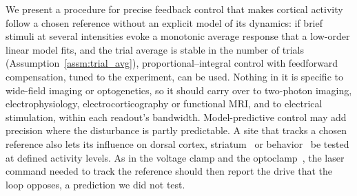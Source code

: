 We present a procedure for precise feedback control that makes cortical activity follow a chosen reference without an explicit model of its dynamics: if brief stimuli at several intensities evoke a monotonic average response that a low-order linear model fits, and the trial average is stable in the number of trials (Assumption~\ref{assm:trial_avg}), proportional--integral control with feedforward compensation, tuned to the experiment, can be used.
Nothing in it is specific to wide-field imaging or optogenetics, so it should carry over to two-photon imaging, electrophysiology, electrocorticography or functional MRI, and to electrical stimulation, within each readout's bandwidth.
Model-predictive control may add precision where the disturbance is partly predictable.
A site that tracks a chosen reference also lets its influence on dorsal cortex, striatum~\citep{Peters2021} or behavior~\citep{ZatkaHaas2021} be tested at defined activity levels.
As in the voltage clamp and the optoclamp~\citep{newman2015optogenetic}, the laser command needed to track the reference should then report the drive that the loop opposes, a prediction we did not test.
